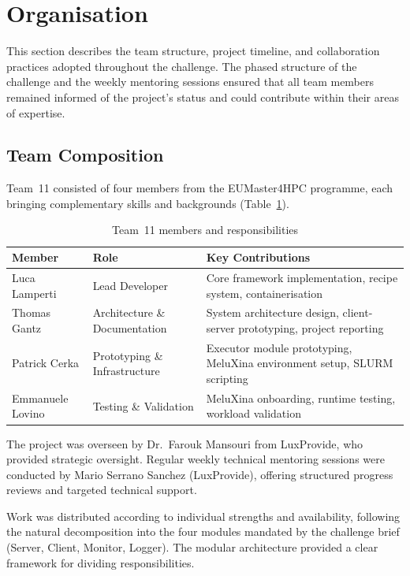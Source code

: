 \documentclass[11pt,a4paper]{article}
\begin{document}
\section{Organisation}

This section describes the team structure, project timeline, and collaboration practices adopted throughout the challenge. The phased structure of the challenge and the weekly mentoring sessions ensured that all team members remained informed of the project's status and could contribute within their areas of expertise.

\subsection{Team Composition}

Team~11 consisted of four members from the EUMaster4HPC programme, each bringing complementary skills and backgrounds (Table~\ref{tab:team}).

\begin{table}[htbp]
\centering
\caption{Team~11 members and responsibilities}
\label{tab:team}
\begin{tabularx}{\textwidth}{@{}l l X@{}}
\toprule
\textbf{Member} & \textbf{Role} & \textbf{Key Contributions} \\
\midrule
Luca Lamperti & Lead Developer & Core framework implementation, recipe system, containerisation \\
Thomas Gantz & Architecture \& Documentation & System architecture design, client-server prototyping, project reporting \\
Patrick Cerka & Prototyping \& Infrastructure & Executor module prototyping, MeluXina environment setup, SLURM scripting \\
Emmanuele Lovino & Testing \& Validation & MeluXina onboarding, runtime testing, workload validation \\
\bottomrule
\end{tabularx}
\end{table}

The project was overseen by Dr.~Farouk Mansouri from LuxProvide, who provided strategic oversight. Regular weekly technical mentoring sessions were conducted by Mario Serrano Sanchez (LuxProvide), offering structured progress reviews and targeted technical support.

Work was distributed according to individual strengths and availability, following the natural decomposition into the four modules mandated by the challenge brief (Server, Client, Monitor, Logger). The modular architecture provided a clear framework for dividing responsibilities.
\end{document}

